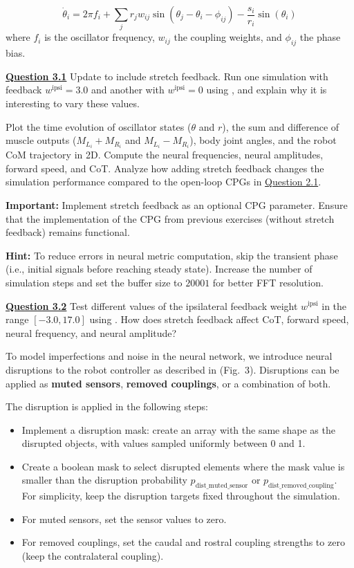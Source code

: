 \documentclass{cmc}
\begin{document}
\begin{equation}
\label{eq:dtheta_sf}
  \dot{\theta}_i = 2 \pi f_i + \sum_j r_j w_{ij} \sin(\theta_j - \theta_i - \phi_{ij}) - \frac{s_i}{r_i} \sin(\theta_i)
\end{equation}
where $f_i$ is the oscillator frequency, $w_{ij}$ the coupling weights, and $\phi_{ij}$ the phase bias.

\textbf{\underline{Question 3.1}} Update  to include stretch feedback. Run one simulation with feedback $w^{\text{ipsi}} = 3.0$ and another with $w^{\text{ipsi}} = 0$ using , and explain why it is interesting to vary these values.

Plot the time evolution of oscillator states ($\theta$ and $r$), the sum and difference of muscle outputs ($M_{L_i} + M_{R_i}$ and $M_{L_i} - M_{R_i}$), body joint angles, and the robot CoM trajectory in 2D. Compute the neural frequencies, neural amplitudes, forward speed, and CoT. Analyze how adding stretch feedback changes the simulation performance compared to the open-loop CPGs in \underline{Question 2.1}.

\textbf{Important:} Implement stretch feedback as an optional CPG parameter. Ensure that the implementation of the CPG from previous exercises (without stretch feedback) remains functional.

\textbf{Hint:} To reduce errors in neural metric computation, skip the transient phase (i.e., initial signals before reaching steady state). Increase the number of simulation steps and set the buffer size to $20001$ for better FFT resolution.


\textbf{\underline{Question 3.2}} Test different values of the ipsilateral feedback weight $w^{\text{ipsi}}$ in the range $[-3.0, 17.0]$ using . How does stretch feedback affect CoT, forward speed, neural frequency, and neural amplitude?

To model imperfections and noise in the neural network, we introduce neural disruptions to the robot controller as described in \cite{thandiackal2021emergence} (Fig.~3). Disruptions can be applied as \textbf{muted sensors}, \textbf{removed couplings}, or a combination of both.

The disruption is applied in the following steps:
\begin{itemize}
    \item Implement a disruption mask: create an array with the same shape as the disrupted objects, with values sampled uniformly between 0 and 1.
    \item Create a boolean mask to select disrupted elements where the mask value is smaller than the disruption probability $p_{\text{dist\_muted\_sensor}}$ or $p_{\text{dist\_removed\_coupling}}$. For simplicity, keep the disruption targets fixed throughout the simulation.
    \item For muted sensors, set the sensor values to zero.
    \item For removed couplings, set the caudal and rostral coupling strengths to zero (keep the contralateral coupling).
\end{itemize}
\end{document}
